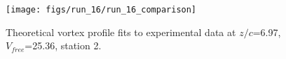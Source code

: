 \begin{figure}[H]
\centering
\texttt{[image: figs/run\_16/run\_16\_comparison]}
\caption{Theoretical vortex profile fits to experimental data at $z/c$=6.97, $V_{free}$=25.36, station 2.}
\label{fig:run_16_comparison}
\end{figure}


